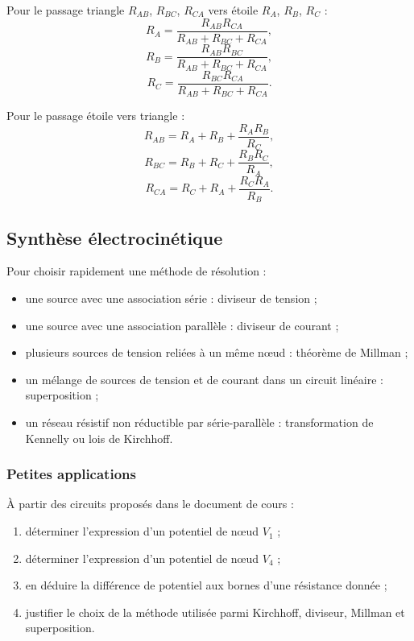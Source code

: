 Pour le passage triangle $R_{AB}$, $R_{BC}$, $R_{CA}$ vers étoile $R_A$, $R_B$, $R_C$ :
\[
R_A=\frac{R_{AB}R_{CA}}{R_{AB}+R_{BC}+R_{CA}},
\]
\[
R_B=\frac{R_{AB}R_{BC}}{R_{AB}+R_{BC}+R_{CA}},
\]
\[
R_C=\frac{R_{BC}R_{CA}}{R_{AB}+R_{BC}+R_{CA}}.
\]

Pour le passage étoile vers triangle :
\[
R_{AB}=R_A+R_B+\frac{R_AR_B}{R_C},
\]
\[
R_{BC}=R_B+R_C+\frac{R_BR_C}{R_A},
\]
\[
R_{CA}=R_C+R_A+\frac{R_CR_A}{R_B}.
\]

\subsection{Synthèse électrocinétique}

Pour choisir rapidement une méthode de résolution :
\begin{itemize}
  \item une source avec une association série : diviseur de tension ;
  \item une source avec une association parallèle : diviseur de courant ;
  \item plusieurs sources de tension reliées à un même nœud : théorème de Millman ;
  \item un mélange de sources de tension et de courant dans un circuit linéaire : superposition ;
  \item un réseau résistif non réductible par série-parallèle : transformation de Kennelly ou lois de Kirchhoff.
\end{itemize}

\subsubsection{Petites applications}

À partir des circuits proposés dans le document de cours :
\begin{enumerate}
  \item déterminer l'expression d'un potentiel de nœud $V_1$ ;
  \item déterminer l'expression d'un potentiel de nœud $V_4$ ;
  \item en déduire la différence de potentiel aux bornes d'une résistance donnée ;
  \item justifier le choix de la méthode utilisée parmi Kirchhoff, diviseur, Millman et superposition.
\end{enumerate}


